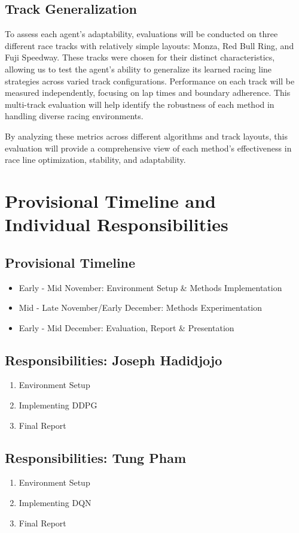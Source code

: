 \documentclass{article}
\begin{document}
\subsection{Track Generalization}
To assess each agent’s adaptability, evaluations will be conducted on three different race tracks with relatively simple layouts: Monza, Red Bull Ring, and Fuji Speedway. These tracks were chosen for their distinct characteristics, allowing us to test the agent’s ability to generalize its learned racing line strategies across varied track configurations. Performance on each track will be measured independently, focusing on lap times and boundary adherence. This multi-track evaluation will help identify the robustness of each method in handling diverse racing environments.

By analyzing these metrics across different algorithms and track layouts, this evaluation will provide a comprehensive view of each method’s effectiveness in race line optimization, stability, and adaptability.


\section{Provisional Timeline and Individual Responsibilities}

\subsection{Provisional Timeline}
\begin{itemize}
    \item Early - Mid November: Environment Setup \& Methods Implementation
    \item Mid - Late November/Early December: Methods Experimentation
    \item Early - Mid December: Evaluation, Report \& Presentation
\end{itemize}

\subsection{Responsibilities: Joseph Hadidjojo}
\begin{enumerate}
    \item Environment Setup
    \item Implementing DDPG
    \item Final Report
\end{enumerate}
    
\subsection{Responsibilities: Tung Pham}
\begin{enumerate}
    \item Environment Setup
    \item Implementing DQN
    \item Final Report
\end{enumerate}



\end{document}
